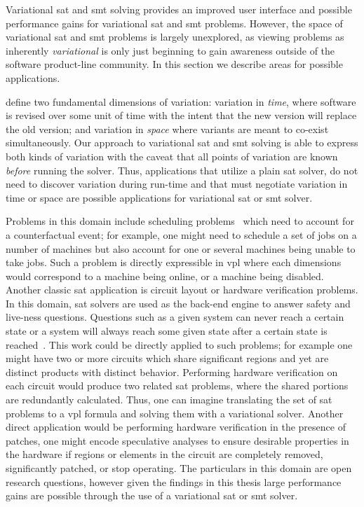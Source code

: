 \label{section:conclusion:applications}
%
Variational \ac{sat} and \ac{smt} solving provides an improved user interface
and possible performance gains for variational \ac{sat} and \ac{smt} problems.
However, the space of variational \ac{sat} and \ac{smt} problems is largely
unexplored, as viewing problems as inherently \emph{variational} is only just
beginning to gain awareness outside of the software product-line community. In
this section we describe areas for possible applications.

\citet{TTS+:VariVolution19} define two fundamental dimensions of variation:
variation in \emph{time}, where software is revised over some unit of time with
the intent that the new version will replace the old version; and variation in
\emph{space} where variants are meant to co-exist simultaneously. Our approach
to variational \ac{sat} and \ac{smt} solving is able to express both kinds of
variation with the caveat that all points of variation are known \emph{before}
running the solver. Thus, applications that utilize a plain \ac{sat} solver, do
not need to discover variation during run-time and that must negotiate variation
in time or space are possible applications for variational \ac{sat} or \ac{smt}
solver.

Problems in this domain include scheduling problems~\cite{BBH+09} which need to
account for a counterfactual event; for example, one might need to schedule a
set of jobs on a number of machines but also account for one or several machines
being unable to take jobs. Such a problem is directly expressible in \ac{vpl}
where each dimensions would correspond to a machine being online, or a machine
being disabled. Another classic \ac{sat} application is circuit
layout or hardware verification problems. In this domain, \ac{sat} solvers are
used as the back-end engine to answer safety and live-ness questions. Questions
such as a given system can never reach a certain state or a system will always
reach some given state after a certain state is reached~\cite{BBH+09}. This work
could be directly applied to such problems; for example one might have two or
more circuits which share significant regions and yet are distinct products with
distinct behavior. Performing hardware verification on each circuit would
produce two related \ac{sat} problems, where the shared portions are redundantly
calculated. Thus, one can imagine translating the set of \ac{sat} problems to a
\ac{vpl} formula and solving them with a variational solver. Another direct
application would be performing hardware verification in the presence of
patches, one might encode speculative analyses to ensure desirable properties in
the hardware if regions or elements in the circuit are completely removed,
significantly patched, or stop operating. The particulars in this domain are
open research questions, however given the findings in this thesis large
performance gains are possible through the use of a variational \ac{sat} or
\ac{smt} solver.

